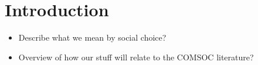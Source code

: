 \chapter{Introduction}
\begin{notes}
    \begin{itemize}
        \item Describe what we mean by social choice?
        \item Overview of how our stuff will relate to the COMSOC literature?
    \end{itemize}
\end{notes}
